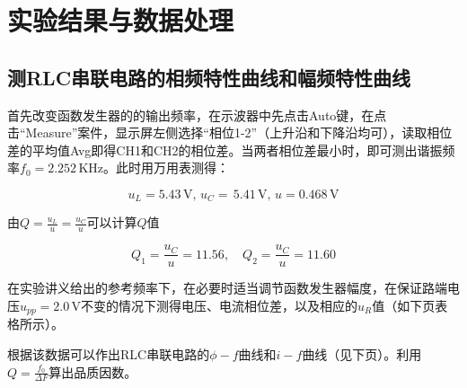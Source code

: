 \documentclass[12pt]{article}
\begin{document}
\section{实验结果与数据处理}
\subsection{测RLC串联电路的相频特性曲线和幅频特性曲线}
首先改变函数发生器的的输出频率，在示波器中先点击Auto键，在点击“Measure”案件，显示屏左侧选择“相位1-2”（上升沿和下降沿均可），读取相位差的平均值Avg即得CH1和CH2的相位差。当两者相位差最小时，即可测出谐振频率$f_0=2.252\,\mathrm{KHz}$。此时用万用表测得：

\[
    u_L=5.43\,\mathrm{V},\,u_C=\,5.41\,\mathrm{V},\,u=0.468\,\mathrm{V}
\]

由$Q=\frac{u_L}{u}=\frac{u_C}{u}$可以计算$Q$值

\[
    Q_1=\frac{u_C}{u}=11.56,\quad Q_2=\frac{u_C}{u}=11.60
\]

在实验讲义给出的参考频率下，在必要时适当调节函数发生器幅度，在保证路端电压$ u_{pp}=2.0\,\mathrm V $不变的情况下测得电压、电流相位差，以及相应的$ u_R $值（如下页表格所示）。

根据该数据可以作出RLC串联电路的$\phi-f$曲线和$i-f$曲线（见下页）。利用$Q=\frac{f_0}{\Delta F}$算出品质因数。

\newpage
\end{document}
